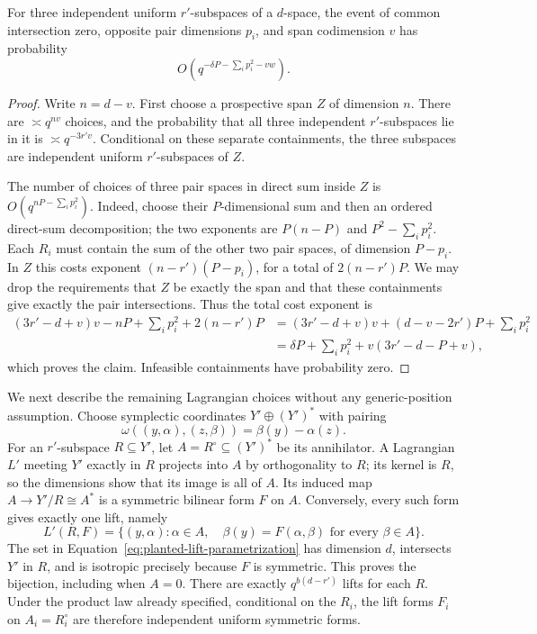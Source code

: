 \begin{lemma}\label{lem:planted-subspace-cost}
For three independent uniform $r'$-subspaces of a $d$-space, the
event of common intersection zero, opposite pair dimensions $p_i$,
and span codimension $v$ has probability
\begin{equation}\label{eq:planted-subspace-cost}
 O\left(q^{-\delta P-\sum_i p_i^2-vw}\right).
\end{equation}
\end{lemma}
\begin{proof}
Write $n=d-v$.  First choose a prospective span $Z$ of dimension
$n$.  There are $\asymp q^{nv}$ choices, and the probability that
all three independent $r'$-subspaces lie in it is
$\asymp q^{-3r'v}$.  Conditional on these separate containments,
the three subspaces are independent uniform $r'$-subspaces of $Z$.

The number of choices of three pair spaces in direct sum inside
$Z$ is $O(q^{nP-\sum_i p_i^2})$.  Indeed, choose their $P$-dimensional
sum and then an ordered direct-sum decomposition; the two exponents
are $P(n-P)$ and $P^2-\sum_i p_i^2$.  Each $R_i$ must contain the
sum of the other two pair spaces, of dimension $P-p_i$.  In $Z$
this costs exponent $(n-r')(P-p_i)$, for a total of
$2(n-r')P$.  We may drop the requirements that $Z$ be exactly the
span and that these containments give exactly the pair intersections.
Thus the total cost exponent is
\begin{align*}
 (3r'-d+v)v-nP+\sum_i p_i^2+2(n-r')P
 &= (3r'-d+v)v+(d-v-2r')P+\sum_i p_i^2\\
 &=\delta P+\sum_i p_i^2+v(3r'-d-P+v),
\end{align*}
which proves the claim.  Infeasible containments have probability zero.
\end{proof}

We next describe the remaining Lagrangian choices without any
generic-position assumption.  Choose symplectic coordinates
$Y'\oplus(Y')^*$ with pairing
\[
 \omega((y,\alpha),(z,\beta))=\beta(y)-\alpha(z).
\]
For an $r'$-subspace $R\subseteq Y'$, let $A=R^\circ\subseteq(Y')^*$
be its annihilator.  A Lagrangian $L'$ meeting $Y'$ exactly in $R$
projects into $A$ by orthogonality to $R$; its kernel is $R$,
so the dimensions show that its image is all of $A$.  Its induced map
$A\longrightarrow Y'/R\cong A^*$ is a symmetric bilinear form
$F$ on $A$.  Conversely, every such form gives exactly one lift,
namely
\begin{equation}\label{eq:planted-lift-parametrization}
 L'(R,F)=\{(y,\alpha):\alpha\in A,\quad
              \beta(y)=F(\alpha,\beta)\text{ for every }\beta\in A\}.
\end{equation}
The set in Equation~\eqref{eq:planted-lift-parametrization} has dimension
$d$, intersects $Y'$ in $R$, and is isotropic precisely because $F$
is symmetric.  This proves the bijection, including when $A=0$.
There are exactly $q^{b(d-r')}$ lifts for each $R$.  Under the
product law already specified, conditional on the $R_i$, the lift
forms $F_i$ on $A_i=R_i^\circ$ are therefore independent uniform
symmetric forms.

